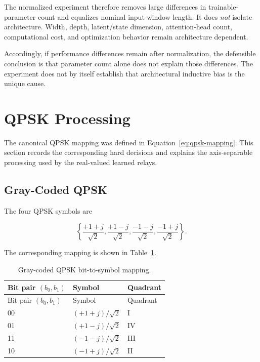 The normalized experiment therefore removes large differences in
trainable-parameter count and equalizes nominal input-window length.
It does \emph{not} isolate architecture. Width, depth, latent/state
dimension, attention-head count, computational cost, and optimization
behavior remain architecture dependent.

Accordingly, if performance differences remain after normalization,
the defensible conclusion is that parameter count alone does not
explain those differences. The experiment does not by itself establish
that architectural inductive bias is the unique cause.


\section{QPSK Processing}\label{sec:modulation-schemes}

The canonical QPSK mapping was defined in
Equation~\eqref{eq:qpsk-mapping}. This section records the corresponding
hard decisions and explains the axis-separable processing used by the
real-valued learned relays.

\subsection{Gray-Coded QPSK}
\label{sec:qpsk-gray-coded-quadrature-phase-shift-keying}

The four QPSK symbols are

\[
\left\{
\frac{+1+j}{\sqrt2},
\frac{+1-j}{\sqrt2},
\frac{-1-j}{\sqrt2},
\frac{-1+j}{\sqrt2}
\right\}.
\]

The corresponding mapping is shown in
Table~\ref{tbl:table29}.

\begin{longtable}[]{@{}lll@{}}
\caption[QPSK Gray-coded symbol mapping]
{Gray-coded QPSK bit-to-symbol mapping.}
\label{tbl:table29}\tabularnewline

\toprule
Bit pair $(b_0,b_1)$ & Symbol & Quadrant \\
\midrule
\endfirsthead

\toprule
Bit pair $(b_0,b_1)$ & Symbol & Quadrant \\
\midrule
\endhead

\bottomrule
\endlastfoot

00 & $(+1+j)/\sqrt2$ & I \\
01 & $(+1-j)/\sqrt2$ & IV \\
11 & $(-1-j)/\sqrt2$ & III \\
10 & $(-1+j)/\sqrt2$ & II \\

\end{longtable}

